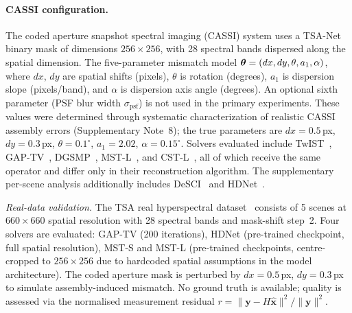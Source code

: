 \paragraph{CASSI configuration.}
\begin{sloppypar}
The coded aperture snapshot spectral imaging (CASSI) system uses a TSA-Net
binary mask of dimensions $256 \times 256$, with 28 spectral bands
dispersed along the spatial dimension.  The five-parameter mismatch model
$\boldsymbol{\theta} = (dx, dy, \theta, a_1, \alpha)$,
where $dx$, $dy$ are spatial shifts (pixels), $\theta$ is rotation (degrees),
$a_1$ is dispersion slope (pixels/band), and $\alpha$ is dispersion axis angle (degrees).
An optional sixth parameter (PSF blur width $\sigma_{\text{psf}}$) is not used in the primary experiments.
These values were determined through systematic characterization of realistic CASSI
assembly errors (Supplementary Note~8); the true parameters are
$dx{=}0.5$\,px, $dy{=}0.3$\,px, $\theta{=}0.1^\circ$, $a_1{=}2.02$, $\alpha{=}0.15^\circ$.
Solvers evaluated include TwIST~\cite{bioucasdias2007twist}, GAP-TV~\cite{yuan2016gaptv},
DGSMP~\cite{huang2021dgsmp}, MST-L~\cite{cai2022mst}, and CST-L~\cite{cai2022cst},
all of which receive the same operator and differ only in their reconstruction algorithm.
The supplementary per-scene analysis additionally includes DeSCI~\cite{liu2019rank} and HDNet~\cite{hu2022hdnet}.
\end{sloppypar}

\begin{sloppypar}
\textit{Real-data validation.}
The TSA real hyperspectral dataset~\cite{wagadarikar2008cassi} consists of
5 scenes at $660 \times 660$ spatial resolution with 28 spectral bands
and mask-shift step~2.  Four solvers are evaluated: GAP-TV (200 iterations),
HDNet (pre-trained checkpoint, full spatial resolution), MST-S and MST-L
(pre-trained checkpoints, centre-cropped to $256 \times 256$ due to
hardcoded spatial assumptions in the model architecture).  The coded
aperture mask is perturbed by $dx = 0.5$\,px, $dy = 0.3$\,px to simulate
assembly-induced mismatch.  No ground truth is available; quality is
assessed via the normalised measurement residual $r = \|\mathbf{y} - H\hat{\mathbf{x}}\|^2 / \|\mathbf{y}\|^2$.
\end{sloppypar}

